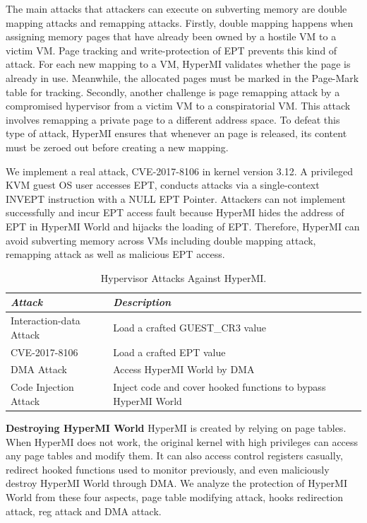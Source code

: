 \documentclass[conference]{IEEEtran}
\begin{document}
The main attacks that attackers can execute on subverting memory are double mapping attacks and remapping attacks.
Firstly, double mapping happens when assigning memory pages that have already been owned by a hostile VM to a victim VM. Page tracking and write-protection of EPT prevents this kind of attack. For each new mapping to a VM, HyperMI validates whether the page is already in use. Meanwhile, the allocated pages must be marked in the Page-Mark table for tracking. Secondly, another challenge is page remapping attack by a compromised hypervisor from a victim VM to a conspiratorial VM. This attack involves remapping a private page to a different address space. To defeat this type of attack, HyperMI ensures that whenever an page is released, its content must be zeroed out before creating a new mapping.


We implement a real attack, CVE-2017-8106 in kernel version 3.12. A privileged KVM guest OS user accesses EPT, conducts attacks via a single-context INVEPT instruction with a NULL EPT Pointer. Attackers can not implement successfully and incur EPT access fault because HyperMI hides the address of EPT in HyperMI World and hijacks the loading of EPT. Therefore, HyperMI can avoid subverting memory across VMs including double mapping attack, remapping attack as well as malicious EPT access.


\begin{table}
\centering
\caption{Hypervisor Attacks Against HyperMI.}\label{tab3}
\begin{tabular}{p{2.8cm}|p{5.5cm}}
\hline
{\itshape\bfseries Attack} & {\itshape\bfseries Description} \\
\hline
Interaction-data Attack & Load a crafted GUEST\_CR3 value\\
\hline
CVE-2017-8106 & Load a crafted EPT value \\
\hline
DMA Attack & Access HyperMI World by DMA \\
\hline
Code Injection Attack & Inject code and cover hooked functions to bypass HyperMI World \\
\hline
\end{tabular}
\end{table}

\textbf{Destroying HyperMI World}
HyperMI is created by relying on page tables. When HyperMI does not work, the original kernel with high privileges can access any page tables and modify them. It can also access control registers casually, redirect hooked functions used to monitor previously, and even maliciously destroy HyperMI World through DMA. We analyze the protection of HyperMI World from these four aspects, page table modifying attack, hooks redirection attack, reg attack and DMA attack.
\end{document}
